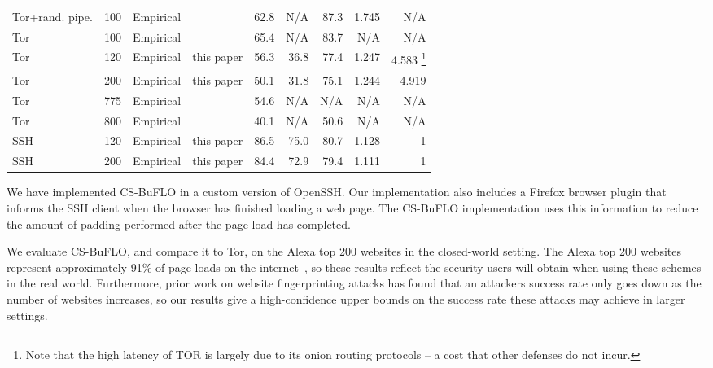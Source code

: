 \documentclass[10pt,journal]{IEEEtran}
\newcommand{\csb} {CS-BuFLO\xspace}
\begin{document}
\begin{table*}
\begin{minipage}{\textwidth}
\begin{center}
\begin{tabular}{|lrllrrrrr|}
    Tor+rand. pipe.                    & 100 & Empirical  & \cite{cai-ccs12}        & 62.8      & N/A   & 87.3  & 1.745    & N/A           \\
    Tor                                & 100 & Empirical  & \cite{cai-ccs12}        & 65.4      & N/A   & 83.7  & N/A      & N/A           \\
    Tor                                & 120 & Empirical  & this paper              & 56.3      & 36.8  & 77.4  & 1.247    & 4.583 	\footnote{Note that the high latency of TOR is largely due to its onion routing protocols -- a cost that other defenses do not incur.}	 \\
    Tor                                & 200 & Empirical  & this paper              & 50.1      & 31.8  & 75.1  & 1.244    & 4.919	 	    \\
    Tor                                & 775 & Empirical  & \cite{panchenko-wpes11} & 54.6      & N/A   & N/A   & N/A      & N/A           \\
    Tor                                & 800 & Empirical  & \cite{cai-ccs12}        & 40.1      & N/A   & 50.6  & N/A      & N/A           \\
    SSH                                & 120 & Empirical  & this paper              & 86.5      & 75.0  & 80.7  & 1.128    & 1         \\
    SSH                                & 200 & Empirical  & this paper              & 84.4      & 72.9  & 79.4  & 1.111    & 1         \\
    \hline
  \end{tabular}
  \end{center}
  \end{minipage}
  \caption{Main evaluation results for \csb, and comparison to results
    on other schemes reported in other papers.}
  \label{results-summary}
\end{table*}



We have implemented \csb in a custom version of OpenSSH.  Our
implementation also includes a Firefox browser plugin that informs the
SSH client when the browser has finished loading a web page.  The \csb
implementation uses this information to reduce the amount of padding
performed after the page load has completed.

We evaluate \csb, and compare it to Tor, on the Alexa top 200 websites
in the closed-world setting.  The Alexa top 200 websites represent
approximately 91\% of page loads on the internet~\cite{alexa-top-sites}, 
so these results reflect the security users will obtain when using these
schemes in the real world.  Furthermore, prior work on website
fingerprinting attacks has found that an attackers success rate only goes
down as the number of websites increases, so our results give a high-confidence
upper bounds on the success rate these attacks may achieve in larger
settings.
\end{document}
